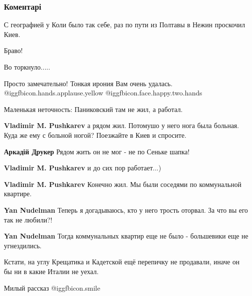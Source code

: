  
 
 
 
 
\subsubsection{Коментарі}

\begin{itemize} %
С географией у Коли было так себе, раз по пути из Полтавы в Нежин проскочил Киев.

Браво!

Во торкнуло.....


Просто замечательно! Тонкая ирония Вам очень удалась.
@igg{fbicon.hands.applause.yellow}  @igg{fbicon.face.happy.two.hands} 

Маленькая неточность: Паниковский там не жил, а работал.

\begin{itemize} %
\textbf{Vladimir M. Pushkarev} а рядом жил. Потомушо у него нога была больная. Куда же ему с больной ногой? Поезжайте в Киев и спросите.

\textbf{Аркадій Друкер} Рядом жить он не мог - не по Сеньке шапка!

\textbf{Vladimir M. Pushkarev} и до сих пор работает...)

\textbf{Vladimir M. Pushkarev} Конечно жил. Мы были соседями по коммунальной квартире.

\textbf{Yan Nudelman} Теперь я догадываюсь, кто у него трость оторвал. За что вы его так не любили?!

\textbf{Yan Nudelman} Тогда коммунальных квартир еще не было - большевики еще не угнездились.
\end{itemize} %

Кстати, на углу Крещатика и Кадетской ещё перепичку не продавали, иначе он бы ни в какие Италии не уехал.

Милый рассказ  @igg{fbicon.smile} 


\end{itemize}
